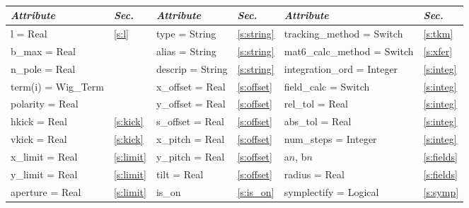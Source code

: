 \toffset
\begin{center}
\tt
\begin{tabular}{|l|l||l|l||l|l|} \hline
  {\sl Attribute} & {\sl Sec.}  & {\sl Attribute} & {\sl Sec.} & {\sl Attribute} & {\sl Sec.} \\ \hline
  l        = Real       & \ref{s:l}      & type = String      & \ref{s:string} & tracking\_method = Switch   & \ref{s:tkm}   \\ \hline
  b\_max   = Real       &                & alias = String     & \ref{s:string} & mat6\_calc\_method = Switch & \ref{s:xfer}  \\ \hline
  n\_pole  = Real       &                & descrip = String   & \ref{s:string} & integration\_ord = Integer  & \ref{s:integ} \\ \hline
  term(i) = Wig\_Term   &                & x\_offset  = Real  & \ref{s:offset} & field\_calc = Switch        & \ref{s:integ} \\ \hline
  polarity = Real       &                & y\_offset  = Real  & \ref{s:offset} & rel\_tol = Real             & \ref{s:integ} \\ \hline
  hkick    = Real       & \ref{s:kick}   & s\_offset  = Real  & \ref{s:offset} & abs\_tol = Real             & \ref{s:integ} \\ \hline
  vkick    = Real       & \ref{s:kick}   & x\_pitch = Real    & \ref{s:offset} & num\_steps = Integer        & \ref{s:integ} \\ \hline
  x\_limit = Real       & \ref{s:limit}  & y\_pitch = Real    & \ref{s:offset} & a$n$, b$n$                  & \ref{s:fields}\\ \hline
  y\_limit = Real       & \ref{s:limit}  & tilt     = Real    & \ref{s:offset} & radius  = Real              & \ref{s:fields}\\ \hline
  aperture = Real       & \ref{s:limit}  & is\_on             & \ref{s:is_on}  & symplectify = Logical       & \ref{s:symp}  \\ \hline
\end{tabular}
\end{center}
\toffset

